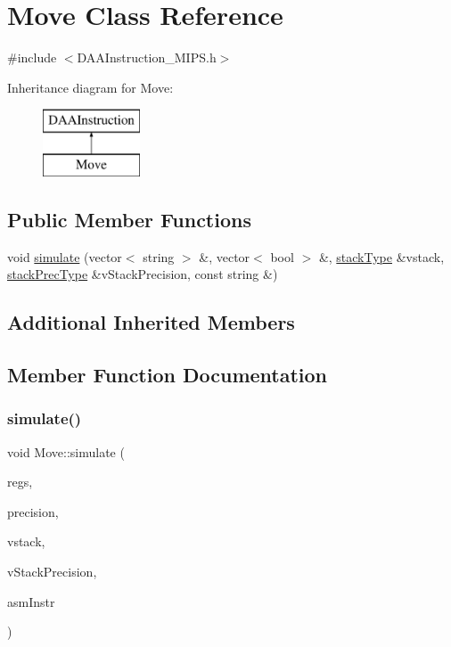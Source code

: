 \hypertarget{classMove}{}\section{Move Class Reference}
\label{classMove}


{\ttfamily \#include $<$D\+A\+A\+Instruction\+\_\+\+M\+I\+P\+S.\+h$>$}

Inheritance diagram for Move\+:\begin{figure}[H]
\begin{center}
\leavevmode
\includegraphics[height=2.000000cm]{classMove}
\end{center}
\end{figure}
\subsection*{Public Member Functions}
\begin{DoxyCompactItemize}
\item 
void \hyperlink{classMove_a50865c6a36b58a052e97ef3d8f8bb171}{simulate} (vector$<$ string $>$ \&, vector$<$ bool $>$ \&, \hyperlink{DAAInstruction_8h_a1b0e70ac1a04f06c8132055ed01f589f}{stack\+Type} \&vstack, \hyperlink{DAAInstruction_8h_ac5cb793e9dac3fa9693da78b7e29ab30}{stack\+Prec\+Type} \&v\+Stack\+Precision, const string \&)
\end{DoxyCompactItemize}
\subsection*{Additional Inherited Members}


\subsection{Member Function Documentation}
\mbox{\label{classMove_a50865c6a36b58a052e97ef3d8f8bb171}} 
\subsubsection{\texorpdfstring{simulate()}{simulate()}}
{\footnotesize\ttfamily void Move\+::simulate (\begin{DoxyParamCaption}\item[{vector$<$ string $>$ \&}]{regs,  }\item[{vector$<$ bool $>$ \&}]{precision,  }\item[{\hyperlink{DAAInstruction_8h_a1b0e70ac1a04f06c8132055ed01f589f}{stack\+Type} \&}]{vstack,  }\item[{\hyperlink{DAAInstruction_8h_ac5cb793e9dac3fa9693da78b7e29ab30}{stack\+Prec\+Type} \&}]{v\+Stack\+Precision,  }\item[{const string \&}]{asm\+Instr }\end{DoxyParamCaption})\hspace{0.3cm}{\ttfamily [virtual]}}


